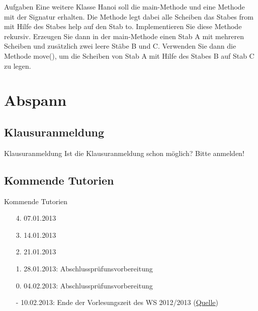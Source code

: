 \documentclass[usepdftitle=false,hyperref={pdfpagelabels=false}]{beamer}
\begin{document}
\begin{frame}{Aufgaben}
    Eine weitere Klasse Hanoi soll die main-Methode und eine Methode mit der Signatur
    erhalten. Die Methode  legt dabei alle Scheiben das
    Stabes from mit Hilfe des Stabes help auf den Stab to. Implementieren Sie diese Methode rekursiv.
    Erzeugen Sie dann in der main-Methode einen Stab A mit mehreren Scheiben und zusätzlich zwei leere
    Stäbe B und C. Verwenden Sie dann die Methode move(), um die Scheiben von Stab A mit Hilfe des
    Stabes B auf Stab C zu legen.
\end{frame}

\section{Abspann}
\subsection{Klausuranmeldung}
\begin{frame}{Klausuranmeldung}
  Ist die Klausuranmeldung schon möglich? Bitte anmelden!
\end{frame}

\subsection{Kommende Tutorien}
\begin{frame}{Kommende Tutorien}
  \begin{itemize}
    \item[4.] 07.01.2013
    \item[3.] 14.01.2013
    \item[2.] 21.01.2013
    \item[1.] 28.01.2013: Abschlussprüfunsvorbereitung
    \item[0.] 04.02.2013: Abschlussprüfunsvorbereitung
    \item[-] 10.02.2013: Ende der Vorlesungszeit des WS 2012/2013 (\href{http://www.kit.edu/studieren/2873.php}{Quelle})
  \end{itemize}
\end{frame}

\end{document}

